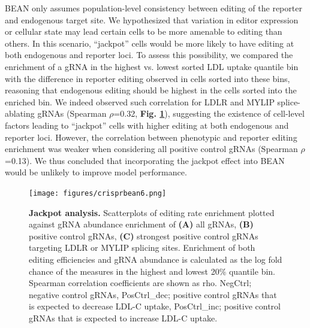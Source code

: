 \documentclass[a4paper, titlepage, openright]{book}
\begin{document}
BEAN only assumes population-level consistency between editing of the reporter and endogenous target site. We hypothesized that variation in editor expression or cellular state may lead certain cells to be more amenable to editing than others. In this scenario, “jackpot” cells would be more likely to have editing at both endogenous and reporter loci. To assess this possibility, we compared the enrichment of a gRNA in the highest vs. lowest sorted LDL uptake quantile bin with the difference in reporter editing observed in cells sorted into these bins, reasoning that endogenous editing should be highest in the cells sorted into the enriched bin. We indeed observed such correlation for LDLR and MYLIP splice-ablating gRNAs (Spearman $\rho$=0.32, \textbf{Fig. \ref{fig:crisprbean6}}), suggesting the existence of cell-level factors leading to “jackpot” cells with higher editing at both endogenous and reporter loci. However, the correlation between phenotypic and reporter editing enrichment was weaker when considering all positive control gRNAs (Spearman $\rho$=0.13). We thus concluded that incorporating the jackpot effect into BEAN would be unlikely to improve model performance.
\begin{figure}
	\centering
	\texttt{[image: figures/crisprbean6.png]}
	\caption[Jackpot analysis]{\textbf{Jackpot analysis. } Scatterplots of editing rate enrichment plotted against gRNA abundance enrichment of \textbf{(A)} all gRNAs, \textbf{(B)} positive control gRNAs, \textbf{(C)} strongest positive control gRNAs targeting LDLR or MYLIP splicing sites. Enrichment of both editing efficiencies and gRNA abundance is calculated as the log fold chance of the measures in the highest and lowest 20\% quantile bin. Spearman correlation coefficients are shown as rho. NegCtrl; negative control gRNAs, PosCtrl\_dec; positive control gRNAs that is expected to decrease LDL-C uptake, PosCtrl\_inc; positive control gRNAs that is expected to increase LDL-C uptake.}
	\label{fig:crisprbean6}
\end{figure} 
\end{document}
